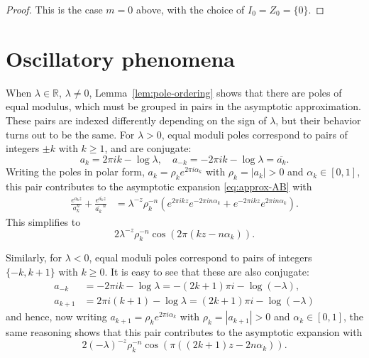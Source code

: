 \documentclass[11pt,a4paper]{amsart}
\newcommand{\R}{\mathbb{R}}
\theoremstyle{plain}
\theoremstyle{remark}
\begin{document}
\begin{proof}
This is the case $m=0$ above, with the choice of $I_{0} = Z_{0}=\{0\}$.
\end{proof}




\section{Oscillatory phenomena}
\label{sec:oscillatory}




When $\lambda \in \R$, $\lambda \neq 0$, Lemma~\ref{lem:pole-ordering} shows that there are poles of equal modulus, which must be grouped in pairs in the asymptotic approximation. These pairs are indexed differently depending on the sign of $\lambda$, but their behavior turns out to be the same.
For $\lambda > 0$, equal moduli poles correspond to pairs of integers $\pm k$ with $k \geq 1$, and are conjugate:
$$
	a_{k} = 2\pi i k - \log\lambda, \quad a_{-k} = -2\pi i k - \log\lambda = \overline{a_{k}}.
$$
Writing the poles in polar form, $a_{k} = \rho_{k} e^{2\pi i \alpha_{k}}$ with $\rho_{k} = |a_{k}| > 0$ and $\alpha_{k} \in [0,1]$, this pair contributes to the asymptotic expansion \eqref{eq:approx-AB} with
$$
\begin{aligned}
	   \frac{e^{a_{k}z}}{a_{k}^{n}} + \frac{e^{\overline{a_{k}}z}}{\overline{a_{k}}^{\, n}}
	&= \lambda^{-z }\rho_{k}^{-n} 
	   \left(
			e^{2\pi i k z} e^{-2\pi i n \alpha_{k}}
		  + e^{-2\pi i k z} e^{2\pi i n \alpha_{k}}
	   \right).
\end{aligned}
$$
This simplifies to
%
\begin{equation}
\label{eq:cos-pos}
	2 \lambda^{-z} \rho_{k}^{-n} \cos(2 \pi (kz - n \alpha_{k})).
\end{equation}
%


Similarly, for $\lambda < 0$, equal moduli poles correspond to pairs of integers $\{-k,k+1\}$ with $k \geq 0$. It is easy to see that these are also conjugate:
$$
\begin{aligned}
	 a_{-k} &= -2\pi i k - \log\lambda
	         = -(2k+1)\pi i - \log(-\lambda),
	        \\
	a_{k+1} &= 2\pi i(k+1) - \log\lambda
	         = (2k+1)\pi i - \log(-\lambda)
\end{aligned}
$$
and hence, now writing $a_{k+1} = \rho_{k} e^{2\pi i \alpha_{k}}$ with $\rho_{k} = |a_{k+1}| > 0$ and $\alpha_{k} \in [0,1]$, the same reasoning shows that this pair contributes to the asymptotic expansion with 
%
\begin{equation}
\label{eq:cos-neg}
	2 (-\lambda)^{-z} \rho_{k}^{-n} \cos(\pi ((2k+1) z - 2 n \alpha_{k})).
\end{equation}
%
\end{document}
